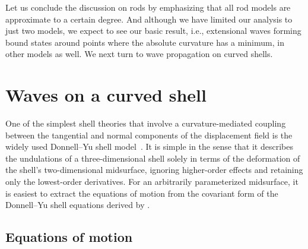 Let us conclude the discussion on rods by emphasizing that all rod models are approximate to a certain degree.
And although we have limited our analysis to just two models, we expect to see our basic result, i.e., extensional waves forming bound states around points where the absolute curvature has a minimum, in other models as well.
We next turn to wave propagation on curved shells.

\section{Waves on a curved shell}
\label{sec:shell}

One of the simplest shell theories that involve a curvature-mediated coupling between the tangential and normal components of the displacement field is the widely used Donnell--Yu shell model~\cite{donnell1933,yu1955}.
It is simple in the sense that it describes the undulations of a three-dimensional shell solely in terms of the deformation of the shell's two-dimensional midsurface, ignoring higher-order effects and retaining only the lowest-order derivatives.
For an arbitrarily parameterized midsurface, it is easiest to extract the equations of motion from the covariant form of the Donnell--Yu shell equations derived by \citet{pierce1993a}.

\subsection{Equations of motion}

